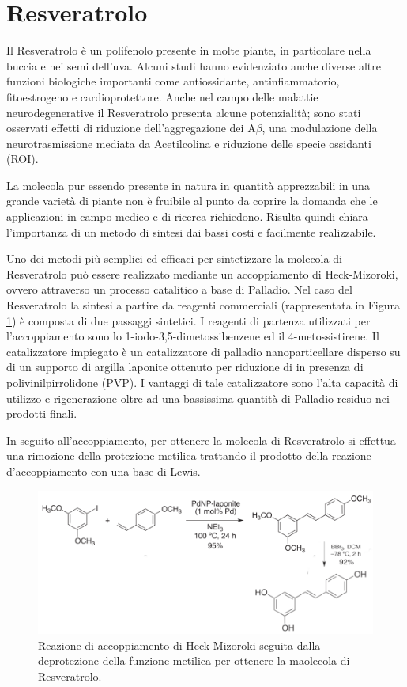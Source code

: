 \documentclass[a4paper, 11pt]{article}
\begin{document}
\section{Resveratrolo}
\label{sec:resv}
Il Resveratrolo è un polifenolo presente in molte piante, in particolare nella buccia e nei semi dell'uva. Alcuni studi hanno evidenziato anche diverse altre funzioni biologiche importanti come antiossidante, antinfiammatorio, fitoestrogeno e cardioprotettore. Anche nel campo delle malattie neurodegenerative il Resveratrolo presenta alcune potenzialità; sono stati osservati effetti di riduzione dell'aggregazione dei A$\beta$, una modulazione della neurotrasmissione mediata da Acetilcolina e riduzione delle specie ossidanti (ROI). \cite{jabir_cholinesterase_2018}

La molecola pur essendo presente in natura in quantità apprezzabili in una grande varietà di piante non è fruibile al punto da coprire la domanda che le applicazioni in campo medico e di ricerca richiedono. Risulta quindi chiara l'importanza di un metodo di sintesi dai bassi costi e facilmente realizzabile.

Uno dei metodi più semplici ed efficaci per sintetizzare la molecola di Resveratrolo può essere realizzato mediante un accoppiamento di Heck-Mizoroki, ovvero attraverso un processo catalitico a base di Palladio.
Nel caso del Resveratrolo la sintesi a partire da reagenti commerciali (rappresentata in Figura \ref{fig:totale_resveratrolo}) è composta di due passaggi sintetici. I reagenti di partenza utilizzati per l'accoppiamento sono lo 1-iodo-3,5-dimetossibenzene ed il 4-metossistirene. Il catalizzatore impiegato è un catalizzatore di palladio nanoparticellare disperso su di un supporto di argilla laponite ottenuto per riduzione di  in presenza di polivinilpirrolidone (PVP). \cite{martinez_extremely_2015}
I vantaggi di tale catalizzatore sono l'alta capacità di utilizzo e rigenerazione oltre ad una bassissima quantità di Palladio residuo nei prodotti finali.

In seguito all'accoppiamento, per ottenere la molecola di Resveratrolo si effettua una rimozione della protezione metilica trattando il prodotto della reazione d'accoppiamento con una base di Lewis. \cite{alejandro_v._martinez_expedient_2017}

\begin{figure}[H]
	\centering
	\includegraphics[width=.7\linewidth]{immagini/totale_resveratrolo.png}
	\caption{Reazione di accoppiamento di Heck-Mizoroki seguita dalla deprotezione della funzione metilica per ottenere la maolecola di Resveratrolo.}
	\label{fig:totale_resveratrolo}
\end{figure}
\end{document}
